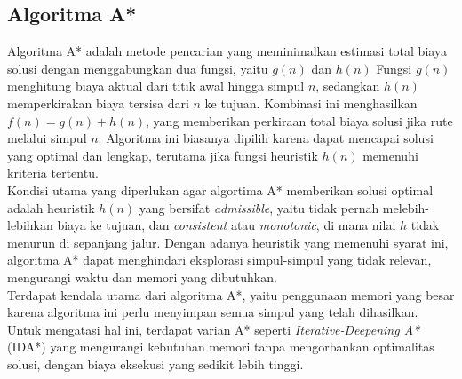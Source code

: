 \subsection{Algoritma A* ~\cite{Russell:09:ai}}
\label{a*}
Algoritma A* adalah metode pencarian yang meminimalkan estimasi total biaya solusi dengan menggabungkan dua fungsi, yaitu $g(n)$ dan $h(n)$ Fungsi $g(n)$ menghitung biaya aktual dari titik awal hingga simpul $n$, sedangkan $h(n)$ memperkirakan biaya tersisa dari $n$ ke tujuan. Kombinasi ini menghasilkan $f(n) = g(n) + h(n)$, yang memberikan perkiraan total biaya solusi jika rute melalui simpul $n$. Algoritma ini biasanya dipilih karena dapat mencapai solusi yang optimal dan lengkap, terutama jika fungsi heuristik $h(n)$ memenuhi kriteria tertentu.
\\
Kondisi utama yang diperlukan agar algortima A* memberikan solusi optimal adalah heuristik $h(n)$ yang bersifat \textit{admissible}, yaitu tidak pernah melebih-lebihkan biaya ke tujuan, dan \textit{consistent} atau \textit{monotonic}, di mana nilai $h$ tidak menurun di sepanjang jalur. Dengan adanya heuristik yang memenuhi syarat ini, algoritma A* dapat menghindari eksplorasi simpul-simpul yang tidak relevan, mengurangi waktu dan memori yang dibutuhkan.
\\
Terdapat kendala utama dari algoritma A*, yaitu penggunaan memori yang besar karena algoritma ini perlu menyimpan semua simpul yang telah dihasilkan. Untuk mengatasi hal ini, terdapat varian A* seperti \textit{Iterative-Deepening A*} (IDA*) yang mengurangi kebutuhan memori tanpa mengorbankan optimalitas solusi, dengan biaya eksekusi yang sedikit lebih tinggi.